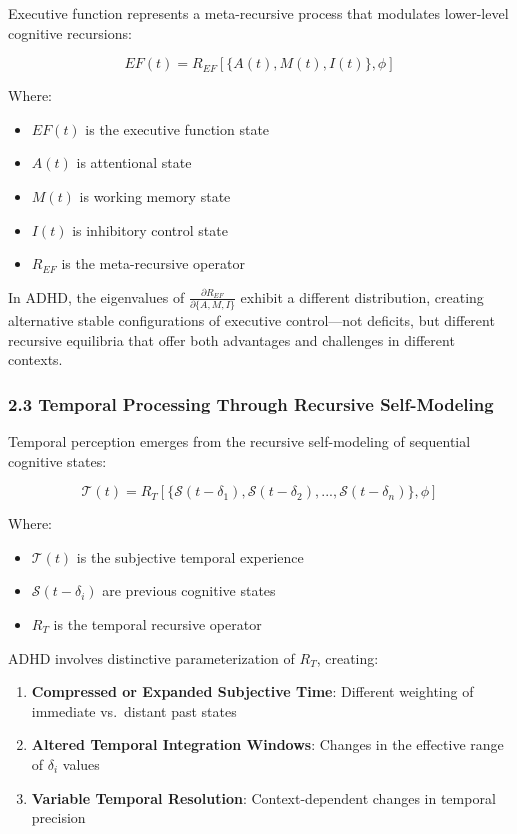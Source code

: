 \documentclass[
]{article}
\providecommand{\tightlist}{%
  \setlength{\itemsep}{0pt}\setlength{\parskip}{0pt}}
\begin{document}
Executive function represents a meta-recursive process that modulates
lower-level cognitive recursions:

\[EF(t) = R_{EF}[\{A(t), M(t), I(t)\}, \phi]\]

Where:

\begin{itemize}
\tightlist
\item
  \(EF(t)\) is the executive function state
\item
  \(A(t)\) is attentional state
\item
  \(M(t)\) is working memory state
\item
  \(I(t)\) is inhibitory control state
\item
  \(R_{EF}\) is the meta-recursive operator
\end{itemize}

In ADHD, the eigenvalues of
\(\frac{\partial R_{EF}}{\partial \{A,M,I\}}\) exhibit a different
distribution, creating alternative stable configurations of executive
control---not deficits, but different recursive equilibria that offer
both advantages and challenges in different contexts.

\subsubsection{2.3 Temporal Processing Through Recursive
Self-Modeling}\label{temporal-processing-through-recursive-self-modeling}

Temporal perception emerges from the recursive self-modeling of
sequential cognitive states:

\[\mathcal{T}(t) = R_T[\{\mathcal{S}(t-\delta_1), \mathcal{S}(t-\delta_2), ..., \mathcal{S}(t-\delta_n)\}, \phi]\]

Where:

\begin{itemize}
\tightlist
\item
  \(\mathcal{T}(t)\) is the subjective temporal experience
\item
  \(\mathcal{S}(t-\delta_i)\) are previous cognitive states
\item
  \(R_T\) is the temporal recursive operator
\end{itemize}

ADHD involves distinctive parameterization of \(R_T\), creating:

\begin{enumerate}
\def\labelenumi{\arabic{enumi}.}
\tightlist
\item
  \textbf{Compressed or Expanded Subjective Time}: Different weighting
  of immediate vs.~distant past states
\item
  \textbf{Altered Temporal Integration Windows}: Changes in the
  effective range of \(\delta_i\) values
\item
  \textbf{Variable Temporal Resolution}: Context-dependent changes in
  temporal precision
\end{enumerate}
\end{document}
